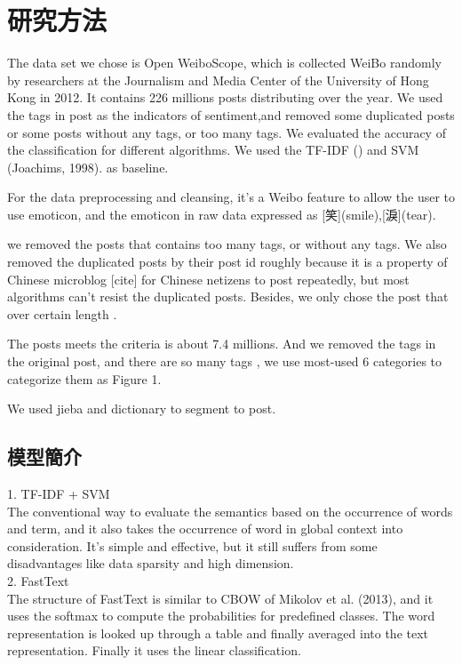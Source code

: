 \chapter{研究方法}

The data set we chose is Open WeiboScope, which is collected WeiBo randomly by researchers at the Journalism and Media Center of the University of Hong Kong in 2012. It contains 226 millions posts distributing over the year. We used the tags in post as the indicators of sentiment,and removed some duplicated posts or some posts without any tags, or too many tags. We evaluated the accuracy of the classification for different algorithms.  We used the TF-IDF () and SVM (Joachims, 1998). as baseline.

For the data preprocessing and cleansing, it's a Weibo feature to allow the user to use emoticon, and the emoticon in raw data expressed as [笑](smile),[淚](tear).

we removed the posts that contains too many tags, or without any tags. We also removed the duplicated posts by their post id roughly because it is a property of Chinese microblog [cite] for Chinese netizens to post repeatedly, but most algorithms can't resist the duplicated posts. Besides, we only chose the post that over certain length .
 
The posts meets the criteria is about 7.4 millions. And we removed the tags in the original post, and there are so many tags , we use most-used 6 categories to categorize them as Figure 1.

We used jieba and dictionary to segment to post.



\section{模型簡介}

1. TF-IDF + SVM \\

	The conventional way to evaluate the semantics based on the occurrence of words and term, and it also takes the occurrence of word in global context into consideration.  It's simple and effective, but it still suffers from some disadvantages like data sparsity and high dimension. \\
	
2. FastText\\
	
	The structure of FastText is similar to CBOW of Mikolov et al. (2013), and it uses the softmax to compute the probabilities for predefined classes. The word representation is looked up through a table and finally averaged into the text representation. Finally it uses the linear classification.
 
